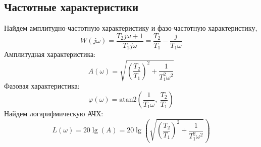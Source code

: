 \subsection{Частотные характеристики}
\noindent Найдем амплитудно-частотную характеристику и фазо-частотную характеристику,
\begin{equation}
    W(j\omega) = \frac{T_2j\omega + 1}{T_1j\omega} = \frac{T_2}{T_1} - \frac{j}{T_1\omega}
\end{equation}
Амплитудная характеристика:
\begin{equation}
    A(\omega) = \sqrt{\left(\frac{T_2}{T_1}\right)^2 + \frac{1}{T_1^2\omega^2}}
\end{equation}
Фазовая характеристика:
\begin{equation}
    \varphi(\omega) = \text{atan2}\left(\frac{1}{T_1\omega},~\frac{T_2}{T_1}\right)
\end{equation}
Найдем логарифмическую АЧХ: 
\begin{equation}
    L(\omega) = 20\lg(A) = 20\lg\left(\sqrt{\left(\frac{T_2}{T_1}\right)^2 + \frac{1}{T_1^2\omega^2}}\right)
\end{equation}

